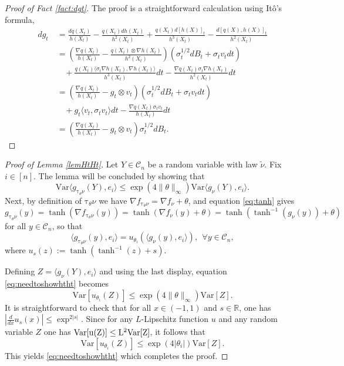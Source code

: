 \documentclass[12pt]{article}
\def \tilt{ \mathrm{\tau} }
\def \RR {\mathbb R}
\def \DC {\mathcal{C}_n}
\theoremstyle{definition}
\theoremstyle{remark}
\begin{document}
\begin{proof}[Proof of Fact \ref{fact:dgt}]
	The proof is a straightforward calculation using It\^{o}'s formula,
	\begin{align}
	d g_t ~& = \frac{d q(X_t)}{h(X_t)} - \frac{q(X_t) d h(X_t) }{ h^2(X_t) } + \frac{q(X_t) d[h(X)]_t }{h^3(X_t)} - \frac{d[q(X),h(X)]_t}{h^2(X_t)} \nonumber \\
	& = \left  ( \frac{\nabla q(X_t) }{ h(X_t)} - \frac{q(X_t) \otimes \nabla h(X_t) }{h^2(X_t)} \right ) \left ( \sigma_t^{1/2} d B_t + \sigma_t v_t dt \right ) \nonumber \\
	& ~~~~ + \frac{q(X_t) \langle \sigma_t \nabla h(X_t), \nabla h(X_t) \rangle }{h^3(X_t)} dt - \frac{ \nabla q(X_t) \sigma_t \nabla h(X_t)  }{h^2(X_t)} dt \nonumber \\
	& = \left  ( \frac{\nabla q(X_t) }{ h(X_t)} - g_t \otimes v_t \right ) \left ( \sigma_t^{1/2} d B_t + \sigma_t v_t dt \right ) \nonumber \\
	& ~~~~ + g_t \langle v_t, \sigma_t v_t \rangle dt - \frac{ \nabla q(X_t) \sigma_t v_t  }{h(X_t)} dt \nonumber \\
	& = \left  ( \frac{\nabla q(X_t) }{ h(X_t)} - g_t \otimes v_t \right ) \sigma_t^{1/2} d B_t. \nonumber
	\end{align}
\end{proof}

\begin{proof}[Proof of Lemma \ref{lemHtHt}]
	Let $Y \in \DC$ be a random variable with law $\tilde \nu$. Fix $i \in [n]$. The lemma will be concluded by showing that 
	\begin{equation}\label{eq:needtoshowhtht}
	\mathrm{Var}  \langle g_{\tilt_\theta \nu}(Y), e_i \rangle \leq \exp(4 \| \theta \|_\infty ) \mathrm{Var}  \langle g_{\nu}(Y), e_i \rangle.
	\end{equation}
	Next, by definition of $\tilt_\theta \nu$ we have $\nabla f_{\tilt_\theta \nu} = \nabla f_{\nu} + \theta$, and equation \eqref{eq:tanh} gives
	$$
	g_{\tilt_\theta \nu}(y) = \tanh( \nabla f_{\tilt_\theta \nu}(y) ) = \tanh( \nabla f_{\nu}(y) + \theta ) = \tanh( \tanh^{-1}(g_{\nu}(y) ) + \theta )
	$$
	for all $y \in \DC$, so that 
	$$
	\langle g_{\tilt_\theta \nu}(y), e_i \rangle = u_{\theta_i}( \langle g_{\nu}(y), e_i \rangle ), ~~ \forall y \in \DC,$$ 
	where $u_s(z) := \tanh(\tanh^{-1}(z) + s)$.
	
	Defining $Z = \langle g_{\nu}(Y), e_i \rangle$ and using the last display, equation \eqref{eq:needtoshowhtht} becomes
	$$
	\mathrm{Var} \left [ u_{\theta_i}(Z) \right ] \leq \exp(4 \| \theta \|_\infty ) \mathrm{Var} [Z].
	$$
	It is straightforward to check that for all $x \in (-1,1)$ and $s \in \RR$, one has $\left | \frac{d}{dx} u_s(x) \right | \leq \exp^{2 |s|}$. Since for any $L$-Lipschitz function $u$ and any random variable $Z$ one has $\rm{Var} [u(Z)] \leq L^2 \mathrm{Var} [Z]$, it follows that
	$$
	\mathrm{Var} \left [ u_{\theta_i}(Z) \right ] \leq \exp(4 |\theta_i|) \mathrm{Var} [Z].
	$$
	This yields \eqref{eq:needtoshowhtht} which completes the proof.
\end{proof}
\end{document}
